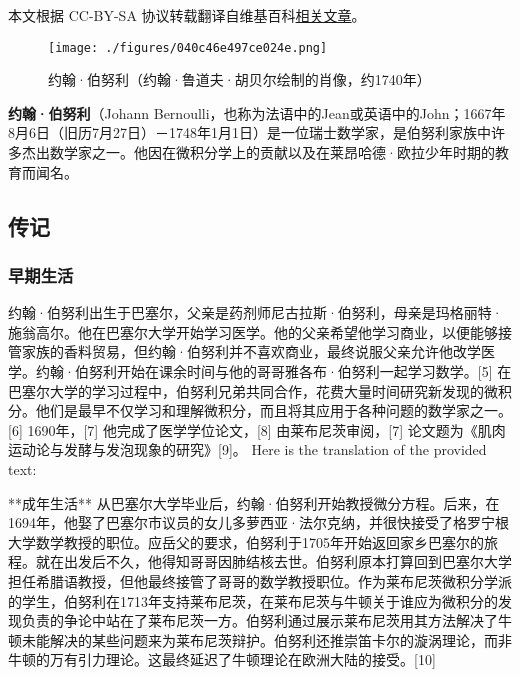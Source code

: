 
本文根据 CC-BY-SA 协议转载翻译自维基百科\href{https://en.wikipedia.org/wiki/Johann_Bernoulli}{相关文章}。

\begin{figure}[ht]
\centering
\texttt{[image: ./figures/040c46e497ce024e.png]}
\caption{约翰·伯努利（约翰·鲁道夫·胡贝尔绘制的肖像，约1740年）} \label{fig_YHBNL_1}
\end{figure}
\textbf{约翰·伯努利}（Johann Bernoulli，也称为法语中的Jean或英语中的John；1667年8月6日（旧历7月27日）－1748年1月1日）是一位瑞士数学家，是伯努利家族中许多杰出数学家之一。他因在微积分学上的贡献以及在莱昂哈德·欧拉少年时期的教育而闻名。
\subsection{传记}  
\subsubsection{早期生活}  
约翰·伯努利出生于巴塞尔，父亲是药剂师尼古拉斯·伯努利，母亲是玛格丽特·施翁高尔。他在巴塞尔大学开始学习医学。他的父亲希望他学习商业，以便能够接管家族的香料贸易，但约翰·伯努利并不喜欢商业，最终说服父亲允许他改学医学。约翰·伯努利开始在课余时间与他的哥哥雅各布·伯努利一起学习数学。[5] 在巴塞尔大学的学习过程中，伯努利兄弟共同合作，花费大量时间研究新发现的微积分。他们是最早不仅学习和理解微积分，而且将其应用于各种问题的数学家之一。[6] 1690年，[7] 他完成了医学学位论文，[8] 由莱布尼茨审阅，[7] 论文题为《肌肉运动论与发酵与发泡现象的研究》[9]。
Here is the translation of the provided text:

**成年生活**  
从巴塞尔大学毕业后，约翰·伯努利开始教授微分方程。后来，在1694年，他娶了巴塞尔市议员的女儿多萝西亚·法尔克纳，并很快接受了格罗宁根大学数学教授的职位。应岳父的要求，伯努利于1705年开始返回家乡巴塞尔的旅程。就在出发后不久，他得知哥哥因肺结核去世。伯努利原本打算回到巴塞尔大学担任希腊语教授，但他最终接管了哥哥的数学教授职位。作为莱布尼茨微积分学派的学生，伯努利在1713年支持莱布尼茨，在莱布尼茨与牛顿关于谁应为微积分的发现负责的争论中站在了莱布尼茨一方。伯努利通过展示莱布尼茨用其方法解决了牛顿未能解决的某些问题来为莱布尼茨辩护。伯努利还推崇笛卡尔的漩涡理论，而非牛顿的万有引力理论。这最终延迟了牛顿理论在欧洲大陆的接受。[10]